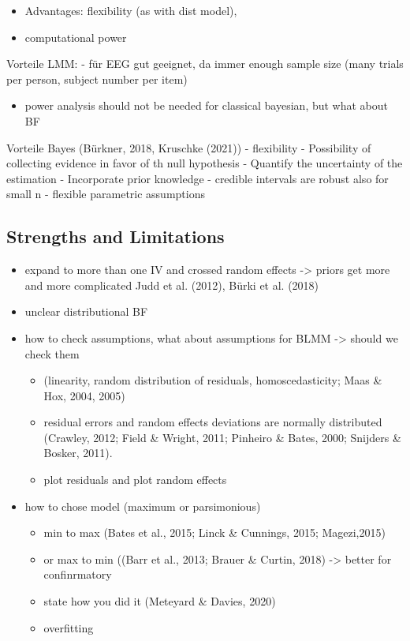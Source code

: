 \documentclass[
  doc,12pt,floatsintext]{apa7}
\providecommand{\tightlist}{%
  \setlength{\itemsep}{0pt}\setlength{\parskip}{0pt}}
\begin{document}
\begin{itemize}
\tightlist
\item
  Advantages: flexibility (as with dist model),
\item
  computational power
\end{itemize}

Vorteile LMM:
- für EEG gut geeignet, da immer enough sample size (many trials per person, subject number per item)

\begin{itemize}
\tightlist
\item
  power analysis should not be needed for classical bayesian, but what about BF
\end{itemize}

Vorteile Bayes (Bürkner, 2018, Kruschke (2021))
- flexibility
- Possibility of collecting evidence in favor of th null hypothesis
- Quantify the uncertainty of the estimation
- Incorporate prior knowledge
- credible intervals are robust also for small n
- flexible parametric assumptions

\subsection{Strengths and Limitations}\label{strengths-and-limitations}

\begin{itemize}
\tightlist
\item
  expand to more than one IV and crossed random effects -\textgreater{} priors get more and more complicated
  Judd et al. (2012), Bürki et al. (2018)
\item
  unclear distributional BF
\item
  how to check assumptions, what about assumptions for BLMM -\textgreater{} should we check them

  \begin{itemize}
  \tightlist
  \item
    (linearity, random distribution of residuals, homoscedasticity; Maas \& Hox, 2004, 2005)
  \item
    residual errors and random effects deviations are normally distributed (Crawley, 2012; Field \& Wright, 2011; Pinheiro \& Bates, 2000; Snijders \& Bosker, 2011).
  \item
    plot residuals and plot random effects
  \end{itemize}
\item
  how to chose model (maximum or parsimonious)

  \begin{itemize}
  \tightlist
  \item
    min to max (Bates et al., 2015; Linck \& Cunnings, 2015; Magezi,2015)
  \item
    or max to min ((Barr et al., 2013; Brauer \& Curtin, 2018) -\textgreater{} better for confinrmatory
  \item
    state how you did it (Meteyard \& Davies, 2020)
  \item
    overfitting
  \end{itemize}
\end{itemize}
\end{document}
